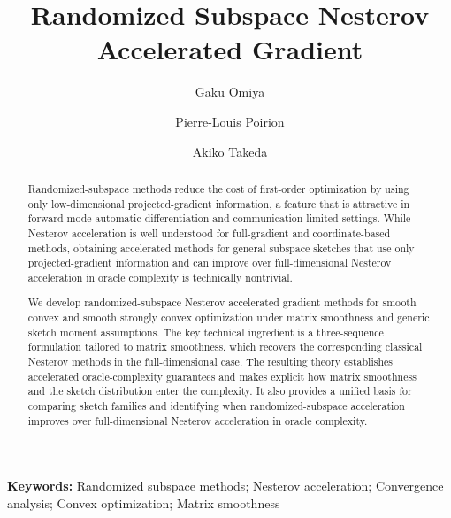 \documentclass[10pt]{article}
\begin{document}
\title{Randomized Subspace Nesterov Accelerated Gradient}

\author[1,2]{Gaku Omiya}
\author[2]{Pierre-Louis Poirion}
\author[1,2]{Akiko Takeda}


\date{}



\maketitle

\begin{abstract}
Randomized-subspace methods reduce the cost of first-order optimization by
using only low-dimensional projected-gradient information, a feature that is
attractive in forward-mode automatic differentiation and communication-limited
settings. While Nesterov acceleration is well understood for full-gradient and
coordinate-based methods, obtaining accelerated methods for general subspace
sketches that use only projected-gradient information and can improve over
full-dimensional Nesterov acceleration in oracle complexity is technically
nontrivial.

We develop randomized-subspace Nesterov accelerated gradient methods for smooth
convex and smooth strongly convex optimization under matrix smoothness and
generic sketch moment assumptions. The key technical ingredient is a
three-sequence formulation tailored to matrix smoothness, which recovers the
corresponding classical Nesterov methods in the full-dimensional case. The
resulting theory establishes accelerated oracle-complexity guarantees and makes
explicit how matrix smoothness and the sketch distribution enter the complexity.
It also provides a unified basis for comparing sketch families and identifying
when randomized-subspace acceleration improves over full-dimensional Nesterov
acceleration in oracle complexity.
\end{abstract}

\noindent\textbf{Keywords:} Randomized subspace methods; Nesterov acceleration; Convergence analysis; Convex optimization; Matrix smoothness
\end{document}
